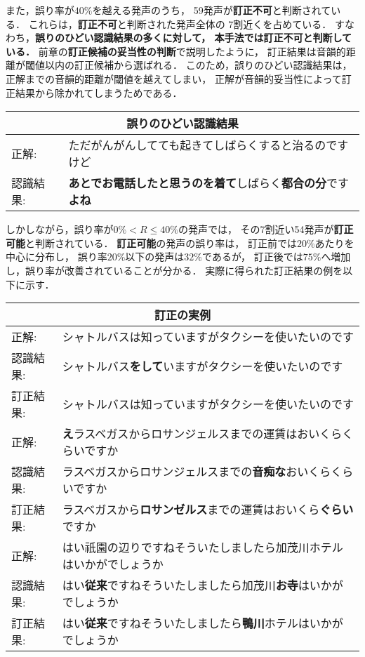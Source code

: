 また，誤り率が$40\%$を越える発声のうち，
59発声が{\bf 訂正不可}と判断されている．
これらは，{\bf 訂正不可}と判断された発声全体の
7割近くを占めている．
すなわち，{\bf 誤りのひどい認識結果の多くに対して，
本手法では訂正不可と判断している．}
前章の{\bf 訂正候補の妥当性の判断}で説明したように，
訂正結果は音韻的距離が閾値以内の訂正候補から選ばれる．
このため，誤りのひどい認識結果は，
正解までの音韻的距離が閾値を越えてしまい，
正解が音韻的妥当性によって訂正結果から除かれてしまうためである．

\begin{center}
\begin{tabular}{|ll|}
\multicolumn{2}{c}{誤りのひどい認識結果}\\
\hline
正解: & ただがんがんしてても起きてしばらくすると治るのですけど \\
認識結果: & {\bf あとでお電話したと思うのを着て}しばらく{\bf 都合の分}です{\bf よね} \\
\hline
\end{tabular}
\end{center}

しかしながら，誤り率が$0\% < R \leq 40\%$の発声では，
その7割近い54発声が{\bf 訂正可能}と判断されている．
{\bf 訂正可能}の発声の誤り率は，
訂正前では$20\%$あたりを中心に分布し，
誤り率$20\%$以下の発声は$32\%$であるが，
訂正後では$75\%$へ増加し，誤り率が改善されていることが分かる．
実際に得られた訂正結果の例を以下に示す．

\begin{center}
\begin{tabular}{|ll|}
\multicolumn{2}{c}{訂正の実例}\\
\hline
正解: & シャトルバスは知っていますがタクシーを使いたいのです \\
認識結果: & シャトルバス{\bf をして}いますがタクシーを使いたいのです \\
訂正結果: & シャトルバスは知っていますがタクシーを使いたいのです \\
\hline
正解: & {\bf え}ラスベガスからロサンジェルスまでの運賃はおいくらくらいですか \\
認識結果: & ラスベガスからロサンジェルスまでの{\bf 音痴な}おいくらくらいですか \\
訂正結果: & ラスベガスから{\bf ロサンゼルス}までの運賃はおいくら{\bf ぐらい}ですか \\
\hline
正解: & はい祇園の辺りですねそういたしましたら加茂川ホテルはいかがでしょうか \\
認識結果: & はい{\bf 従来}ですねそういたしましたら加茂川{\bf お寺}はいかがでしょうか \\
訂正結果: & はい{\bf 従来}ですねそういたしましたら{\bf 鴨川}ホテルはいかがでしょうか \\
\hline
\end{tabular}
\end{center}

